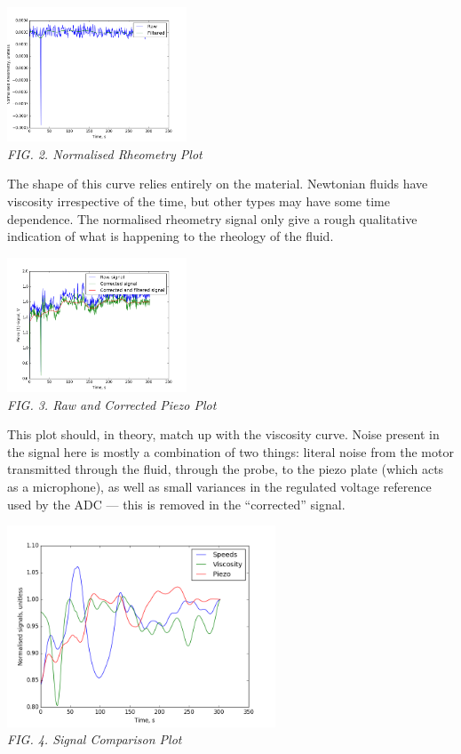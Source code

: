\documentclass{article}
\begin{document}
	{\centering \includegraphics[width=0.4\textwidth]{viscometry.png}\\
	\textit{FIG. 2. Normalised Rheometry Plot}\\}

	The shape of this curve relies entirely on the material. Newtonian fluids have viscosity irrespective of the time, but other types may have some time dependence. The normalised rheometry signal only give a rough qualitative indication of what is happening to the rheology of the fluid.
	
	{\centering \includegraphics[width=0.4\textwidth]{general_piezo.png}\\
	\textit{FIG. 3. Raw and Corrected Piezo Plot}\\}

	This plot should, in theory, match up with the viscosity curve. Noise present in the signal here is mostly a combination of two things: literal noise from the motor transmitted through the fluid, through the probe, to the piezo plate (which acts as a microphone), as well as small variances in the regulated voltage reference used by the ADC --- this is removed in the ``corrected'' signal.
	
	\onecolumn
	
	{\centering \includegraphics[width=0.6\textwidth]{signal_compare.png}\\
	\textit{FIG. 4. Signal Comparison Plot}\\}

	
\end{document}
